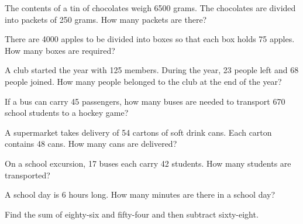 \begin{homework}
\begin{questions}
        \Question[2] The contents of a tin of chocolates weigh 6500 grams. The chocolates are divided into packets of 250 grams. How many packets are there?
            \begin{solutionordottedlines}[2in]
            \end{solutionordottedlines}
        \Question[2] There are 4000 apples to be divided into boxes so that each box holds 75 apples. How many boxes are required?
            \begin{solutionordottedlines}[2in]
            \end{solutionordottedlines}
        \Question[2] A club started the year with 125 members. During the year, 23 people left and 68 people joined. How many people belonged to the club at the end of the year?
            \begin{solutionordottedlines}[2in]
            \end{solutionordottedlines}
        \Question[2] If a bus can carry 45 passengers, how many buses are needed to transport 670 school students to a hockey game?
            \begin{solutionordottedlines}[2in]
            \end{solutionordottedlines}
        \Question[2] A supermarket takes delivery of 54 cartons of soft drink cans. Each carton contains 48 cans. How many cans are delivered?
            \begin{solutionordottedlines}[2in]
            \end{solutionordottedlines}
        \Question[2] On a school excursion, 17 buses each carry 42 students. How many students are transported?
            \begin{solutionordottedlines}[2in]
            \end{solutionordottedlines}
        \Question[2] A school day is 6 hours long. How many minutes are there in a school day?
            \begin{solutionordottedlines}[2in]
            \end{solutionordottedlines}
        \Question[2] Find the sum of eighty-six and fifty-four and then subtract sixty-eight.
            \begin{solutionordottedlines}[2in]
            \end{solutionordottedlines}

\end{questions}
\end{homework}
